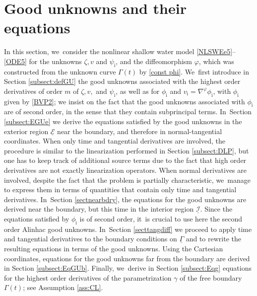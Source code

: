 \documentclass[10pt]{amsart}
\newcommand{\cI}{{\mathcal I}}
\newcommand{\cE}{{\mathcal E}}
\newcommand{\ul}[1]{\underline{#1}}
\newcommand{\itGamma}{\mathit{\Gamma}}
\theoremstyle{definition}
\begin{document}
\section{Good unknowns and their equations}\label{sect:GU}
In this section, we~consider the nonlinear shallow water model \eqref{NLSWEe5}--\eqref{ODE5} for the unknowns $\zeta,v$ and $\psi_\mathrm{i}$,
and the diffeomorphism $\varphi$, which was constructed from the unknown curve $\itGamma(t)$ by \eqref{const phi}. We~first introduce in Section \ref{subsect:defGU} the good unknowns associated with the highest order derivatives of order $m$ of
$\zeta,v,$ and $\psi_\mathrm{i}$, as well as for $\phi_\mathrm{i}$ and $v_\mathrm{i}=\nabla^\varphi \phi_\mathrm{i}$, with $\phi_\mathrm{i}$ given by \eqref{BVP2};
we insist on the fact that the good unknowns associated with $\phi_\mathrm{i}$ are of second order, in the sense that they contain subprincipal terms. In~Section \ref{subsect:EGUe} we derive the equations satisfied by the good unknowns in the exterior region $\ul{\cE}$ near the boundary,
and therefore in normal-tangential coordinates.
When only time and tangential derivatives are involved, the procedure is similar to the linearization performed in Section \ref{subsect:DLP},
but one has to keep track of additional source terms due to the fact that high order derivatives are not exactly linearization operators.
When normal derivatives are involved, despite the fact that the problem is partially characteristic, we~manage to express them in terms of quantities that contain only time and tangential derivatives. In~Section \ref{sectnearbdry}, the equations for the good unknowns are derived near the boundary, but this time in the interior region $\ul{\cI}$.
Since the equations satisfied by $\phi_\mathrm{i}$ is of second order, it~is crucial to use here the second order Alinhac good unknowns. In~Section \ref{secttangdiff} we proceed to apply time and tangential derivatives to the boundary conditions on $\ul{\itGamma}$
and to rewrite the resulting equations in terms of the good unknowns.
Using the Cartesian coordinates, equations for the good unknowns far from the boundary are derived in Section \ref{subsect:EqGUb}.
Finally, we~derive in Section \ref{subsect:Eqg} equations for the highest order derivatives of the parametrization $\gamma$ of the free boundary $\itGamma(t)$;
see Assumption \ref{ass:CL}.
\end{document}
